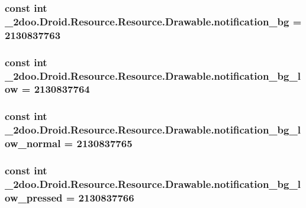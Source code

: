\hypertarget{class__2doo_1_1_droid_1_1_resource_1_1_drawable_893391ce9df9a4e8b67f9cb04651cb5b}{
\subsubsection[{notification\_\-bg}]{\setlength{\rightskip}{0pt plus 5cm}const int \_\-2doo.Droid.Resource.Resource.Drawable.notification\_\-bg = 2130837763}}
\label{class__2doo_1_1_droid_1_1_resource_1_1_drawable_893391ce9df9a4e8b67f9cb04651cb5b}


\hypertarget{class__2doo_1_1_droid_1_1_resource_1_1_drawable_78d5998f03b6b8394330de96818162e5}{
\subsubsection[{notification\_\-bg\_\-low}]{\setlength{\rightskip}{0pt plus 5cm}const int \_\-2doo.Droid.Resource.Resource.Drawable.notification\_\-bg\_\-low = 2130837764}}
\label{class__2doo_1_1_droid_1_1_resource_1_1_drawable_78d5998f03b6b8394330de96818162e5}


\hypertarget{class__2doo_1_1_droid_1_1_resource_1_1_drawable_2b8411f60092a68439ddbf17ee4abe05}{
\subsubsection[{notification\_\-bg\_\-low\_\-normal}]{\setlength{\rightskip}{0pt plus 5cm}const int \_\-2doo.Droid.Resource.Resource.Drawable.notification\_\-bg\_\-low\_\-normal = 2130837765}}
\label{class__2doo_1_1_droid_1_1_resource_1_1_drawable_2b8411f60092a68439ddbf17ee4abe05}


\hypertarget{class__2doo_1_1_droid_1_1_resource_1_1_drawable_e42f34373a9f86d06ad4740e1fcc4109}{
\subsubsection[{notification\_\-bg\_\-low\_\-pressed}]{\setlength{\rightskip}{0pt plus 5cm}const int \_\-2doo.Droid.Resource.Resource.Drawable.notification\_\-bg\_\-low\_\-pressed = 2130837766}}
\label{class__2doo_1_1_droid_1_1_resource_1_1_drawable_e42f34373a9f86d06ad4740e1fcc4109}


